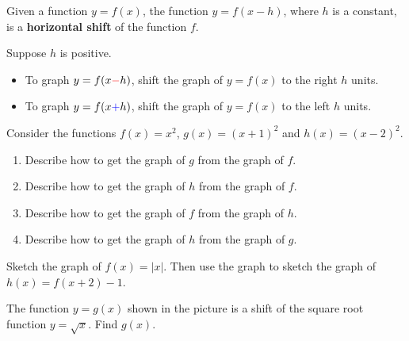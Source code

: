 \begin{definition}
  Given a function \(y=f(x)\), the function \(y=f(x-h)\), where \(h\) is a constant, is a \textbf{horizontal shift} of the function \(f\). 
  \end{definition}

\begin{howto}
  Suppose $h$ is positive. 
\begin{itemize}
  \item To graph $y=f(x {\color{red} -} h)$, shift the graph of $y=f(x)$ to the {\color{red} right} $h$ units. 
  \item To graph $y=f(x {\color{blue} +} h)$, shift the graph of $y=f(x)$ to the {\color{blue} left} $h$ units. 
\end{itemize}
\end{howto}

\begin{example}
  Consider the functions $f(x)=x^2$, $g(x)=(x+1)^2$ and $h(x)=(x-2)^2$.
  \begin{enumerate}
    \item Describe how to get the graph of $g$ from the graph of $f$.
    \item Describe how to get the graph of $h$ from the graph of $f$.
    \item Describe how to get the graph of $f$ from the graph of $h$.
    \item Describe how to get the graph of $h$ from the graph of $g$.
  \end{enumerate}
\end{example}

\newpage

\begin{example}
  Sketch the graph of \(f(x)=|x|\). Then use the graph to sketch the graph of \(h(x)=f(x+2)-1\). 
\end{example}

\begin{example}
  The function $y=g(x)$ shown in the picture is a shift of the square root function $y=\sqrt{x}$. Find $g(x)$.\\

\end{example}
\vspace*{-0.4\textheight}

